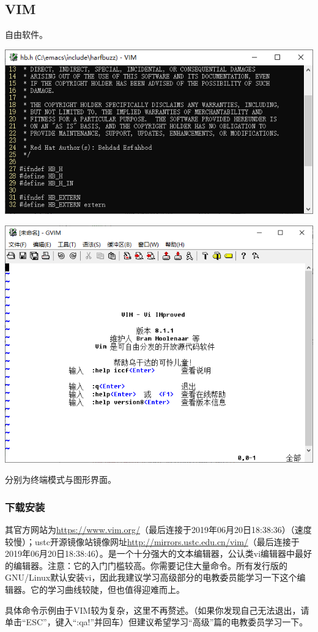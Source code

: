 \subsection{VIM}
自由软件。
\begin{center}
	\includegraphics[scale=0.4]{pic/vim.png}\par   \includegraphics[scale=0.4]{pic/gvim.png}
\end{center} \par
分别为终端模式与图形界面。
\subsubsection{下载安装}
其官方网站为\url{https://www.vim.org/}（最后连接于2019年06月20日18:38:36）（速度较慢）；ustc开源镜像站镜像网址\url{http://mirrors.ustc.edu.cn/vim/}（最后连接于2019年06月20日18:38:46）。是一个十分强大的文本编辑器，公认类vi编辑器中最好的编辑器。注意：它的入门门槛较高。你需要记住大量命令。所有发行版的GNU/Linux默认安装vi，因此我建议学习高级部分的电教委员能学习一下这个编辑器。它的学习曲线较陡，但也值得迎难而上。\par
具体命令示例由于VIM较为复杂，这里不再赘述。（如果你发现自己无法退出，请单击“ESC”，键入“:qa!”并回车）但建议希望学习“高级”篇的电教委员学习一下。
